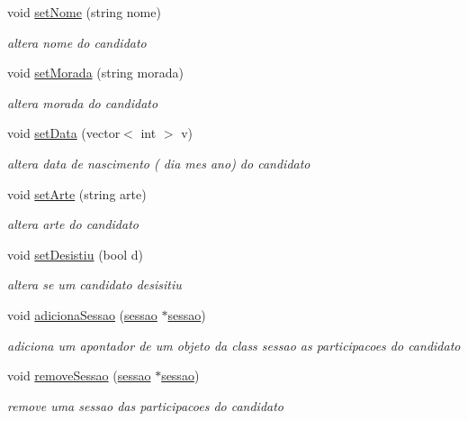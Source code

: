\begin{DoxyCompactItemize}
void \hyperlink{classcandidato_ab3ec398c44b2fbb96671db2a9ab6115d}{set\+Nome} (string nome)
\begin{DoxyCompactList}\small\item\em altera nome do candidato \end{DoxyCompactList}\item 
void \hyperlink{classcandidato_a6bb51b1239e988201502a9f0a2ec27b5}{set\+Morada} (string morada)
\begin{DoxyCompactList}\small\item\em altera morada do candidato \end{DoxyCompactList}\item 
void \hyperlink{classcandidato_a644101f4e5c21eb9a7e99c5b2870e0e0}{set\+Data} (vector$<$ int $>$ v)
\begin{DoxyCompactList}\small\item\em altera data de nascimento ( dia mes ano) do candidato \end{DoxyCompactList}\item 
void \hyperlink{classcandidato_a715b39c52b6811b6607c711a37ee526d}{set\+Arte} (string arte)
\begin{DoxyCompactList}\small\item\em altera arte do candidato \end{DoxyCompactList}\item 
void \hyperlink{classcandidato_a1e2533bef3ab1c4dd1f8d95f3940bb46}{set\+Desistiu} (bool d)
\begin{DoxyCompactList}\small\item\em altera se um candidato desisitiu \end{DoxyCompactList}\item 
void \hyperlink{classcandidato_a1e9453dc3d082a27d45efee32d8ac397}{adiciona\+Sessao} (\hyperlink{classsessao}{sessao} $\ast$\hyperlink{classsessao}{sessao})
\begin{DoxyCompactList}\small\item\em adiciona um apontador de um objeto da class sessao as participacoes do candidato \end{DoxyCompactList}\item 
void \hyperlink{classcandidato_a5ccd7e9263c7caeb4dac72e7d2db57be}{remove\+Sessao} (\hyperlink{classsessao}{sessao} $\ast$\hyperlink{classsessao}{sessao})
\begin{DoxyCompactList}\small\item\em remove uma sessao das participacoes do candidato \end{DoxyCompactList}\item 

\end{DoxyCompactItemize}
